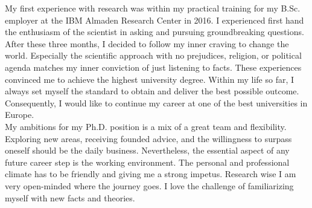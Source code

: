 

\newcommand{\hmwkTitle}{} %
\newcommand{\hmwkClass}{Submission for PhD position in computational social sciences at ETH Zürich} %
\newcommand{\hmwkAuthorName}{Marius Herget} %
\usepackage{booktabs}
\usepackage[toc,page]{appendix}
\usepackage{rotating}
\usepackage{pdflscape}


\usepackage[defernumbers=true,style=numeric,backend=biber,]{biblatex}
\nocite{*}



\maketitle\tableofcontents\newpage
%
%
\begin{homeworkProblem}
    My first experience with research was within my practical training for my B.Sc. employer at the IBM Almaden Research Center in 2016. I experienced first hand the enthusiasm of the scientist in asking and pursuing groundbreaking questions. After these three months, I decided to follow my inner craving to change the world. Especially the scientific approach with no prejudices, religion, or political agenda matches my inner conviction of just listening to facts. These experiences convinced me to achieve the highest university degree. Within my life so far, I always set myself the standard to obtain and deliver the best possible outcome. Consequently, I would like to continue my career at one of the best universities in Europe. \\

    My ambitions for my Ph.D. position is a mix of a great team and flexibility. Exploring new areas, receiving founded advice, and the willingness to surpass oneself should be the daily business. Nevertheless, the essential aspect of any future career step is the working environment. The personal and professional climate has to be friendly and giving me a strong impetus. Research wise I am very open-minded where the journey goes. I love the challenge of familiarizing myself with new facts and theories.
\end{homeworkProblem}


